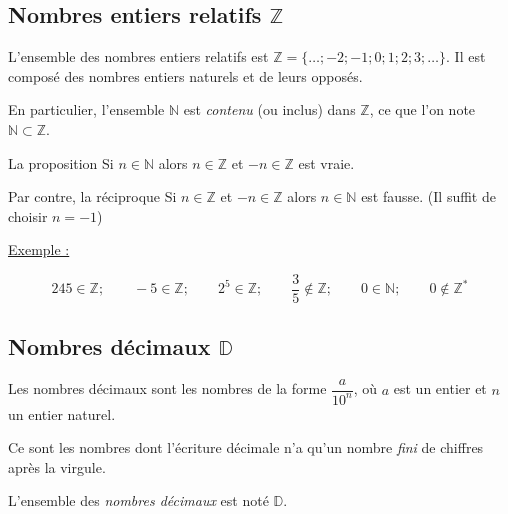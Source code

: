 \documentclass[french]{book}
\newcommand{\N}{\mathbb {N}}
\newcommand{\Z}{\mathbb {Z}}
\newcommand{\D}{\mathbb {D}}
\begin{document}

\subsection*{Nombres entiers relatifs $\Z$}
\begin{defn}
L'ensemble des  nombres entiers relatifs  est $\Z=\{\dots;-2;-1;0;1;2;3;\dots\}$. Il est composé des nombres entiers naturels et de leurs opposés.

En particulier, l'ensemble $\N$ est \emph{contenu} (ou inclus) dans $\Z$, ce que l'on note \og $\N\subset \Z$\fg.
\end{defn}
 

\medskip 
La proposition \og Si $n \in \N $ alors $n\in\Z$ et $-n \in \Z $ \fg{} est vraie. 

Par contre, la réciproque \og Si $n\in\Z$ et $-n\in\Z$  alors  $n\in\N$ \fg{} est fausse. (Il suffit de choisir $n=-1$)

\underline{Exemple :}

\[245 \in \Z ;\qquad -5 \in \Z ;\qquad  2^5 \in \Z ;\qquad \dfrac{3}{5} \notin\Z; \qquad 0 \in\N; \qquad 0 \notin\Z^*\] 

\subsection*{Nombres décimaux $\D$}
\begin{defn}
Les nombres décimaux sont les nombres de la forme $\dfrac{a}{10^n}$, où $a$ est un entier et $n$ un entier naturel. 

Ce sont les nombres dont l'écriture décimale n'a qu'un nombre \emph{fini} de chiffres après la virgule.

L'ensemble des \emph{nombres décimaux} est noté  $\D$. 

\end{defn}
\end{document}
